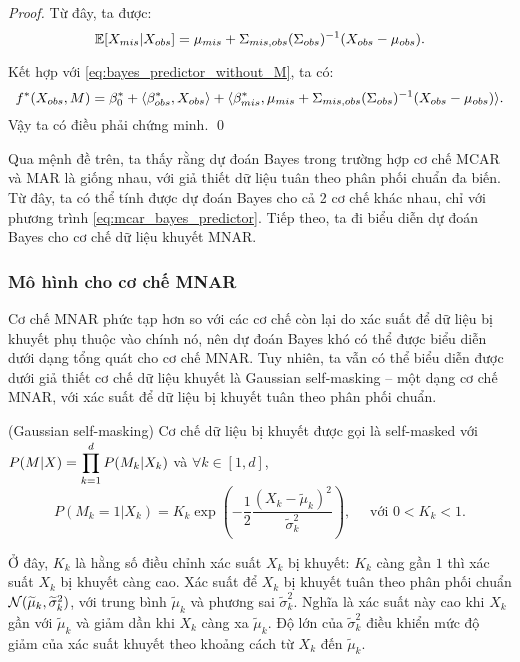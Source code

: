 \begin{proof}
    Từ đây, ta được:
    \[
        \mathbb{E} [X_{mis} | X_{obs}] = \mu_{mis} + \Sigma_{mis,obs} (\Sigma_{obs})^{-1} (X_{obs} - \mu_{obs}).
    \]
    
    Kết hợp với \eqref{eq:bayes_predictor_without_M}, ta có:
    \begin{equation*}
        f^* (X_{obs}, M) = 
        \beta_{0}^{*} + \langle\beta_{obs}^{*}, X_{obs}\rangle 
        + \langle\beta_{mis}^{*}, \mu_{mis} + \Sigma_{mis,obs} (\Sigma_{obs})^{-1} (X_{obs} - \mu_{obs}) \rangle.
    \end{equation*}
    Vậy ta có điều phải chứng minh. \qed
\end{proof}

Qua mệnh đề trên, ta thấy rằng dự đoán Bayes trong trường hợp cơ chế MCAR và MAR là giống nhau, với giả thiết dữ liệu tuân theo phân phối chuẩn đa biến. Từ đây, ta có thể tính được dự đoán Bayes cho cả 2 cơ chế khác nhau, chỉ với phương trình \eqref{eq:mcar_bayes_predictor}. Tiếp theo, ta đi biểu diễn dự đoán Bayes cho cơ chế dữ liệu khuyết MNAR.


\subsubsection{Mô hình cho cơ chế MNAR}
Cơ chế MNAR phức tạp hơn so với các cơ chế còn lại do xác suất để dữ liệu bị khuyết phụ thuộc vào chính nó, nên dự đoán Bayes khó có thể được biểu diễn dưới dạng tổng quát cho cơ chế MNAR. 
Tuy nhiên, ta vẫn có thể biểu diễn được dưới giả thiết cơ chế dữ liệu khuyết là Gaussian self-masking -- một dạng cơ chế MNAR, với xác suất để dữ liệu bị khuyết tuân theo phân phối chuẩn.


\begin{assume}\label{assume:gaussian_self-masking}
    (Gaussian self-masking)
    Cơ chế dữ liệu bị khuyết được gọi là self-masked với 
    $P(M|X) = \displaystyle\prod_{k=1}^d P(M_k|X_k)$ và $\forall k \in [1,d]$,
    \[
        P(M_{k} = 1 | X_{k}) = K_{k} \exp\left( -\frac{1}{2} \frac{(X_{k} - \widetilde{\mu}_{k})^{2}}{\widetilde{\sigma}_{k}^{2}} \right), \quad \text{ với } 0 < K_{k} < 1.
    \]
\end{assume}

Ở đây, $K_k$ là hằng số điều chỉnh xác suất $X_k$ bị khuyết: $K_k$ càng gần $1$ thì xác suất $X_k$ bị khuyết càng cao. Xác suất để $X_k$ bị khuyết tuân theo phân phối chuẩn $\mathcal{N}(\widetilde{\mu}_{k}, \widetilde{\sigma}_{k}^2 )$, với trung bình $\widetilde{\mu}_{k}$ và phương sai $\widetilde{\sigma}_{k}^2$. Nghĩa là xác suất này cao khi $X_k$ gần với $\widetilde{\mu}_{k}$ và giảm dần khi $X_k$ càng xa $\widetilde{\mu}_{k}$. Độ lớn của $\widetilde{\sigma}_{k}^2$ điều khiển mức độ giảm của xác suất khuyết theo khoảng cách từ $X_k$ đến $\widetilde{\mu}_{k}$.

